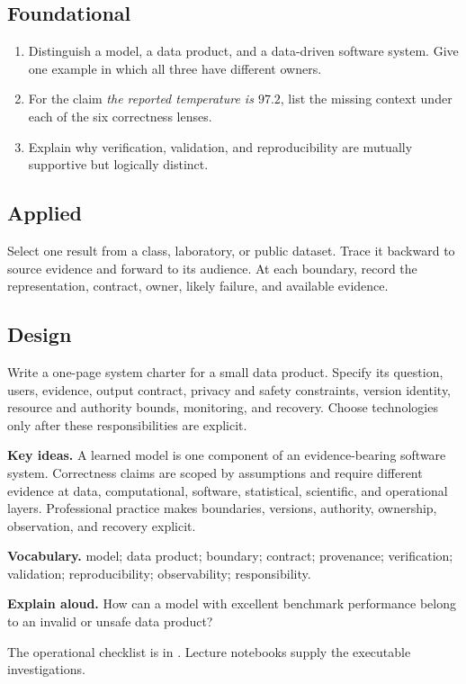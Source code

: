 \subsection*{Foundational}
\begin{enumerate}
  \item Distinguish a model, a data product, and a data-driven software system.
  Give one example in which all three have different owners.
  \item For the claim \emph{the reported temperature is \(97.2\)}, list the
  missing context under each of the six correctness lenses.
  \item Explain why verification, validation, and reproducibility are mutually
  supportive but logically distinct.
\end{enumerate}

\subsection*{Applied}
Select one result from a class, laboratory, or public dataset. Trace it backward
to source evidence and forward to its audience. At each boundary, record the
representation, contract, owner, likely failure, and available evidence.

\subsection*{Design}
Write a one-page system charter for a small data product. Specify its question,
users, evidence, output contract, privacy and safety constraints, version
identity, resource and authority bounds, monitoring, and recovery. Choose
technologies only after these responsibilities are explicit.

\begin{chapterreview}
\textbf{Key ideas.} A learned model is one component of an evidence-bearing
software system. Correctness claims are scoped by assumptions and require
different evidence at data, computational, software, statistical, scientific,
and operational layers. Professional practice makes boundaries, versions,
authority, ownership, observation, and recovery explicit.

\textbf{Vocabulary.} model; data product; boundary; contract; provenance;
verification; validation; reproducibility; observability; responsibility.

\textbf{Explain aloud.} How can a model with excellent benchmark performance
belong to an invalid or unsafe data product?
\end{chapterreview}

\begin{notebooklink}
The operational checklist is in
. Lecture notebooks supply the
executable investigations.
\end{notebooklink}
